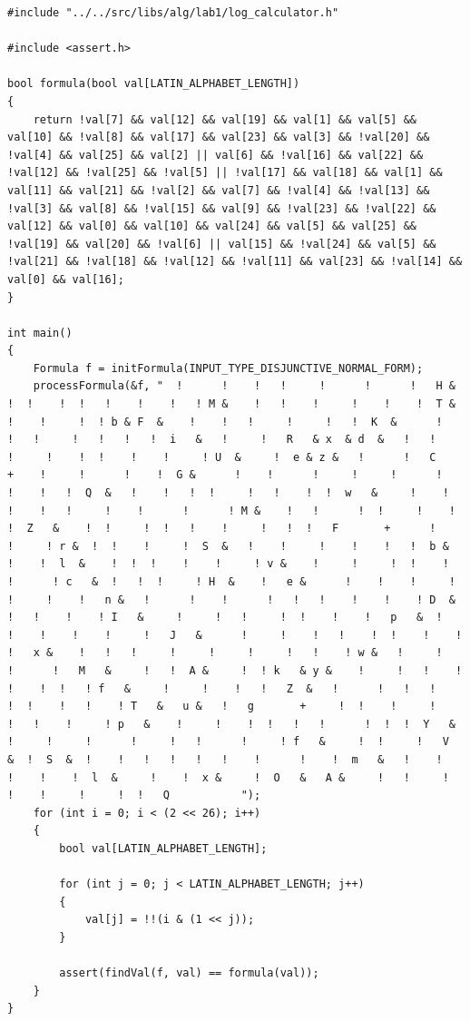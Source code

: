 \documentclass[a4paper,14pt]{extarticle}
\begin{document}
\begin{verbatim}
#include "../../src/libs/alg/lab1/log_calculator.h"

#include <assert.h>

bool formula(bool val[LATIN_ALPHABET_LENGTH])
{
    return !val[7] && val[12] && val[19] && val[1] && val[5] && val[10] && !val[8] && val[17] && val[23] && val[3] && !val[20] && !val[4] && val[25] && val[2] || val[6] && !val[16] && val[22] && !val[12] && !val[25] && !val[5] || !val[17] && val[18] && val[1] && val[11] && val[21] && !val[2] && val[7] && !val[4] && !val[13] && !val[3] && val[8] && !val[15] && val[9] && !val[23] && !val[22] && val[12] && val[0] && val[10] && val[24] && val[5] && val[25] && !val[19] && val[20] && !val[6] || val[15] && !val[24] && val[5] && !val[21] && !val[18] && !val[12] && !val[11] && val[23] && !val[14] && val[0] && val[16];
}

int main()
{
    Formula f = initFormula(INPUT_TYPE_DISJUNCTIVE_NORMAL_FORM);
    processFormula(&f, "  !      !    !   !     !      !      !   H &   !  !    !  !   !    !    !   ! M &    !   !    !     !    !    !  T &   !    !     !  ! b & F  &    !    !   !     !     !   !  K  &      !    !   !     !   !   !   !  i   &   !     !   R   & x  & d  &   !   !      !     !    !  !    !    !     ! U  &     !  e & z &   !      !   C      +    !     !      !    !  G &      !    !      !     !     !      !      !    !   !  Q  &   !    !   !  !     !   !    !  !  w   &     !    !  !    !   !     !    !      !      ! M &    !   !      !  !     !    !     !  Z   &    !  !     !  !   !    !     !   !  !   F       +      !     !     ! r &  !  !    !     !  S  &   !    !     !    !    !   !  b &    !    !  l  &    !  !  !    !    !     ! v &    !     !     !  !    !   !      ! c   &  !   !  !     ! H  &    !   e &      !    !    !     !     !     !    !   n &   !      !    !      !   !   !    !    !    ! D  &   !   !    !    ! I   &     !     !   !     !  !    !    !   p   &  !    !    !    !    !     !   J   &      !     !    !   !    !  !    !    !    !   x &    !   !   !     !     !     !     !   !    ! w &   !     !   !      !   M   &     !   !  A &     !  ! k   & y &    !     !   !    !     !    !  !   ! f   &     !     !    !   !   Z  &   !      !   !   !    !  !    !   !    ! T   &   u &   !   g       +     !  !    !     !     !   !    !     ! p   &    !     !    !  !   !   !      !  !  !  Y   &    !     !     !      !     !   !      !     ! f   &     !  !     !   V   &  !  S  &  !    !   !   !   !   !    !      !    !  m   &   !    !    !    !    !  l  &     !    !  x &     !  O   &   A &     !   !     !   !    !     !     !  !   Q           ");
    for (int i = 0; i < (2 << 26); i++)
    {
        bool val[LATIN_ALPHABET_LENGTH];

        for (int j = 0; j < LATIN_ALPHABET_LENGTH; j++)
        {
            val[j] = !!(i & (1 << j));
        }

        assert(findVal(f, val) == formula(val));
    }
}
\end{verbatim}
\end{document}
